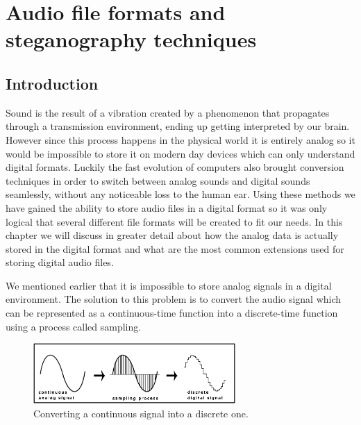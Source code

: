 
\chapter{Audio file formats and steganography techniques}

\begin{multicols*}{2}
\section{Introduction}
Sound is the result of a vibration created by a phenomenon that propagates through a transmission environment, ending up getting interpreted by our brain. However since this process happens in the physical world it is entirely analog so it would be impossible to store it on modern day devices which can only understand digital formats. Luckily the fast evolution of computers also brought conversion techniques in order to switch between analog sounds and digital sounds seamlessly, without any noticeable loss to the human ear. Using these methods we have gained the ability to store audio files in a digital format so it was only logical that several different file formats will be created to fit our needs. In this chapter we will discuss in greater detail about how the analog data is actually stored in the digital format and what are the most common extensions used for storing digital audio files.

We mentioned earlier that it is impossible to store analog signals in a digital environment. The solution to this problem is to convert the audio signal which can be represented as a continuous-time function into a discrete-time function using a process called sampling. 

\begin{figure}[H]
    \centering
    \includegraphics[width=7.7cm,keepaspectratio]{pics/Sampling-of-audio-signal.png}
    \caption{Converting a continuous signal into a discrete one\cite{real_time_audio_steganography}.}
    \label{sampling-graphic-example}
\end{figure}


\end{multicols*}
